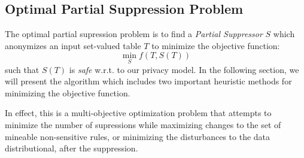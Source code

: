 \subsection{Optimal Partial Suppression Problem}
The optimal partial supression problem is to find a {\em Partial Suppressor} $S$ which anonymizes an input set-valued table $T$ to minimize the objective function:
\[\min_S f(T, S(T))\]
such that $S(T)$ is {\em safe} w.r.t. to our privacy model.
In the following section, we will present the algorithm which 
includes two important heuristic 
methods for minimizing the objective function.

In effect, this is a multi-objective optimization problem 
that attempts to minimize the
number of supressions while maximizing changes to the set 
of mineable non-sensitive rules, or 
minimizing the disturbances to the data distributional, after the suppression.


